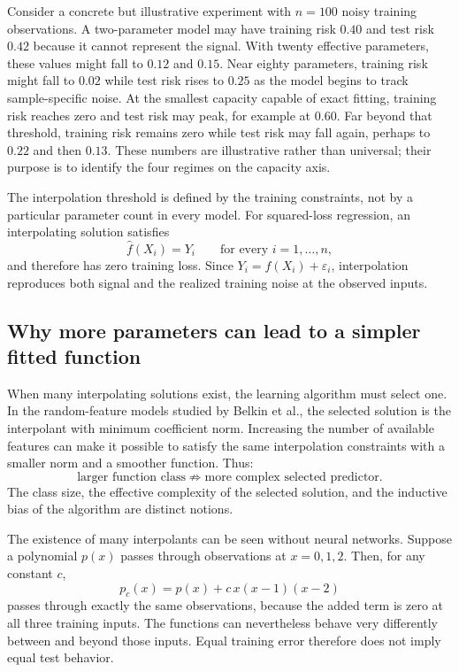 \documentclass[11pt,a4paper]{article}
\begin{document}
Consider a concrete but illustrative experiment with $n=100$ noisy training observations. A two-parameter model may have training risk $0.40$ and test risk $0.42$ because it cannot represent the signal. With twenty effective parameters, these values might fall to $0.12$ and $0.15$. Near eighty parameters, training risk might fall to $0.02$ while test risk rises to $0.25$ as the model begins to track sample-specific noise. At the smallest capacity capable of exact fitting, training risk reaches zero and test risk may peak, for example at $0.60$. Far beyond that threshold, training risk remains zero while test risk may fall again, perhaps to $0.22$ and then $0.13$. These numbers are illustrative rather than universal; their purpose is to identify the four regimes on the capacity axis.

The interpolation threshold is defined by the training constraints, not by a particular parameter count in every model. For squared-loss regression, an interpolating solution satisfies
\begin{equation}
  \widehat f(X_i)=Y_i
  \qquad\text{for every }i=1,\ldots,n,
\end{equation}
and therefore has zero training loss. Since $Y_i=f(X_i)+\varepsilon_i$, interpolation reproduces both signal and the realized training noise at the observed inputs.

\subsection{Why more parameters can lead to a simpler fitted function}

When many interpolating solutions exist, the learning algorithm must select one. In the random-feature models studied by Belkin et al., the selected solution is the interpolant with minimum coefficient norm. Increasing the number of available features can make it possible to satisfy the same interpolation constraints with a smaller norm and a smoother function. Thus:
\begin{equation*}
  \text{larger function class}
  \not\Rightarrow
  \text{more complex selected predictor}.
\end{equation*}
The class size, the effective complexity of the selected solution, and the inductive bias of the algorithm are distinct notions.

The existence of many interpolants can be seen without neural networks. Suppose a polynomial $p(x)$ passes through observations at $x=0,1,2$. Then, for any constant $c$,
\begin{equation}
  p_c(x)=p(x)+c\,x(x-1)(x-2)
\end{equation}
passes through exactly the same observations, because the added term is zero at all three training inputs. The functions can nevertheless behave very differently between and beyond those inputs. Equal training error therefore does not imply equal test behavior.
\end{document}
